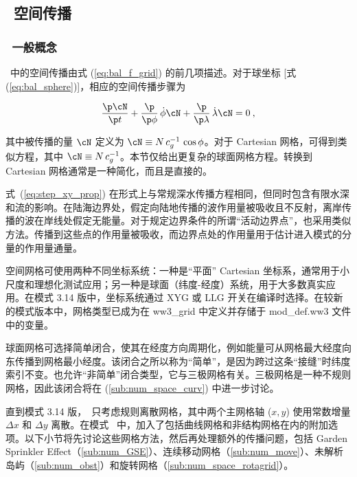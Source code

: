 \vssub
\subsection{~空间传播} \label{sub:xy_prop}
\vssub
\subsubsection{~一般概念}
\vsssub

\ws\ 中的空间传播由式 (\ref{eq:bal_f_grid}) 的前几项描述。对于球坐标 [式 (\ref{eq:bal_sphere})]，相应的空间传播步骤为


\begin{equation}
\frac{\p \cN}{\p t} + \frac{\p}{\p \phi} \, \dot{\phi} \cN +
\frac{\p}{\p \lambda} \, \dot{\lambda} \cN = 0
\: , \label{eq:step_xy_prop} 
\end{equation}

\noindent 
其中被传播的量 $\cN$ 定义为 $\cN \equiv N \, c_g^{-1} \, \cos\phi$。对于 Cartesian 网格，可得到类似方程，其中 $\cN \equiv N \, c_g^{-1}$。本节仅给出更复杂的球面网格方程。转换到 Cartesian 网格通常是一种简化，而且是直接的。

式~(\ref{eq:step_xy_prop}) 在形式上与常规深水传播方程相同，但同时包含有限水深和流的影响。在陆海边界处，假定向陆地传播的波作用量被吸收且不反射，离岸传播的波在岸线处假定无能量。对于规定边界条件的所谓“活动边界点”，也采用类似方法。传播到这些点的作用量被吸收，而边界点处的作用量用于估计进入模式的分量的作用量通量。

空间网格可使用两种不同坐标系统：一种是“平面” Cartesian 坐标系，通常用于小尺度和理想化测试应用；另一种是球面（纬度-经度）系统，用于大多数真实应用。在模式 3.14 版中，坐标系统通过 {\code XYG} 或 {\code LLG} 开关在编译时选择。在较新的模式版本中，网格类型已成为在 {\file ww3\_grid} 中定义并存储于 {\file mod\_def.ww3} 文件中的变量。

球面网格可选择简单闭合，使其在经度方向周期化，例如能量可从网格最大经度向东传播到网格最小经度。该闭合之所以称为“简单”，是因为跨过这条“接缝”时纬度索引不变。也允许“非简单”闭合类型，它与三极网格有关。三极网格是一种不规则网格，因此该闭合将在 (\ref{sub:num_space_curv}) 中进一步讨论。
 
直到模式 3.14 版，\ws\ 只考虑规则离散网格，其中两个主网格轴 ($x,y$) 使用常数增量 $\Delta x$ 和 $\Delta y$ 离散。在模式 \WWver\ 中，加入了包括曲线网格和非结构网格在内的附加选项。以下小节将先讨论这些网格方法，然后再处理额外的传播问题，包括 Garden Sprinkler Effect（\ref{sub:num_GSE}）、连续移动网格（\ref{sub:num_move}）、未解析岛屿（\ref{sub:num_obst}）和旋转网格（\ref{sub:num_space_rotagrid}）。
